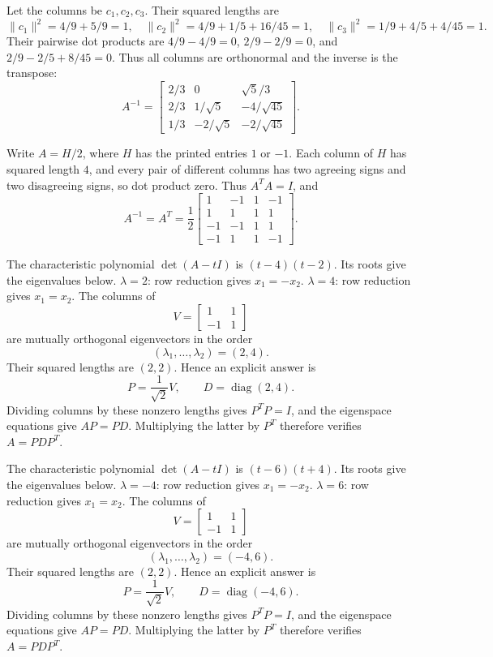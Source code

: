 Let the columns be $c_1,c_2,c_3$. Their squared lengths are
\[
 \|c_1\|^2=4/9+5/9=1,\quad
 \|c_2\|^2=4/9+1/5+16/45=1,\quad
 \|c_3\|^2=1/9+4/5+4/45=1.
\]
Their pairwise dot products are
$4/9-4/9=0$, $2/9-2/9=0$, and
$2/9-2/5+8/45=0$.
Thus all columns are orthonormal and the inverse is the transpose:
\[
 A^{-1}=\begin{bmatrix}
 2/3&0&\sqrt5/3\\2/3&1/\sqrt5&-4/\sqrt{45}\\
 1/3&-2/\sqrt5&-2/\sqrt{45}
 \end{bmatrix}.
\]

Write $A=H/2$, where $H$ has the printed entries $1$ or $-1$.
Each column of $H$ has squared length $4$, and every pair of different
columns has two agreeing signs and two disagreeing signs, so dot product zero.
Thus $A^TA=I$, and
\[
 A^{-1}=A^T=\frac12\begin{bmatrix}
 1&-1&1&-1\\1&1&1&1\\-1&-1&1&1\\-1&1&1&-1
 \end{bmatrix}.
\]

The characteristic polynomial $\det(A-tI)$ is $\left(t - 4\right) \left(t - 2\right)$. Its roots give the eigenvalues below.
$\lambda=2$: row reduction gives \(x_{1}=- x_{2}\).
$\lambda=4$: row reduction gives \(x_{1}=x_{2}\).
The columns of
\[
 V=\begin{bmatrix}1&1\\-1&1\end{bmatrix}
\]
are mutually orthogonal eigenvectors in the order
\[
 (\lambda_1,\ldots,\lambda_2)=(2,4).
\]
Their squared lengths are $(2,2)$. Hence an explicit answer is
\[
 P=\frac1{\sqrt{2}}V,\qquad
 D=\operatorname{diag}(2,4).
\]
Dividing columns by these nonzero lengths gives $P^TP=I$, and the
eigenspace equations give $AP=PD$. Multiplying the latter by $P^T$
therefore verifies $A=PDP^T$.

The characteristic polynomial $\det(A-tI)$ is $\left(t - 6\right) \left(t + 4\right)$. Its roots give the eigenvalues below.
$\lambda=-4$: row reduction gives \(x_{1}=- x_{2}\).
$\lambda=6$: row reduction gives \(x_{1}=x_{2}\).
The columns of
\[
 V=\begin{bmatrix}1&1\\-1&1\end{bmatrix}
\]
are mutually orthogonal eigenvectors in the order
\[
 (\lambda_1,\ldots,\lambda_2)=(-4,6).
\]
Their squared lengths are $(2,2)$. Hence an explicit answer is
\[
 P=\frac1{\sqrt{2}}V,\qquad
 D=\operatorname{diag}(-4,6).
\]
Dividing columns by these nonzero lengths gives $P^TP=I$, and the
eigenspace equations give $AP=PD$. Multiplying the latter by $P^T$
therefore verifies $A=PDP^T$.

